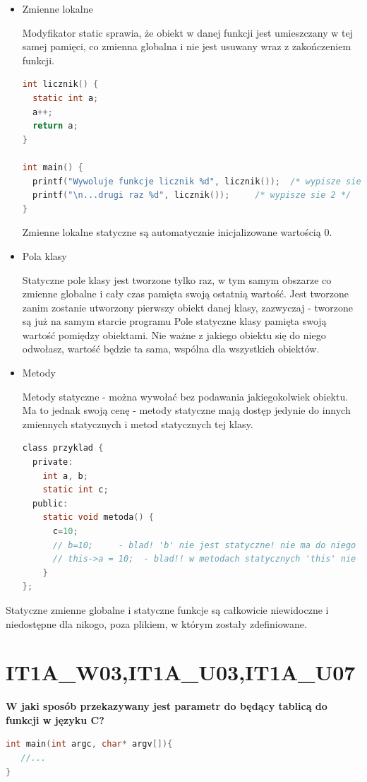 \begin{itemize}
\item Zmienne lokalne

Modyfikator static sprawia, że obiekt w danej funkcji jest umieszczany w tej samej pamięci, co zmienna globalna i nie jest usuwany wraz z zakończeniem funkcji.
\begin{lstlisting}[language=c]
int licznik() {
  static int a;
  a++;
  return a;
}

int main() {
  printf("Wywoluje funkcje licznik %d", licznik());  /* wypisze sie 1 */
  printf("\n...drugi raz %d", licznik());     /* wypisze sie 2 */ 
}
\end{lstlisting}

Zmienne lokalne statyczne są automatycznie inicjalizowane wartością 0.

\item Pola klasy

Statyczne pole klasy jest tworzone tylko raz, w tym samym obszarze co zmienne globalne i cały czas pamięta swoją ostatnią wartość. Jest tworzone zanim zostanie utworzony pierwszy obiekt danej klasy, zazwyczaj - tworzone są już na samym starcie programu
Pole statyczne klasy pamięta swoją wartość pomiędzy obiektami. Nie ważne z jakiego obiektu się do niego odwołasz, wartość będzie ta sama, wspólna dla wszystkich obiektów.

\item Metody

Metody statyczne - można wywołać bez podawania jakiegokolwiek obiektu. Ma to jednak swoją cenę - metody statyczne mają dostęp jedynie do innych zmiennych statycznych i metod statycznych tej klasy. 

\begin{lstlisting}[language=c]
class przyklad {
  private:
    int a, b;
    static int c;
  public:
    static void metoda() {
      c=10; 
      // b=10;     - blad! 'b' nie jest statyczne! nie ma do niego dostepu
      // this->a = 10;  - blad!! w metodach statycznych 'this' nie istnieje!!
    }
};
\end{lstlisting}
\end{itemize}

Statyczne zmienne globalne i statyczne funkcje są całkowicie niewidoczne i niedostępne dla nikogo, poza plikiem, w którym zostały zdefiniowane.



\section{IT1A\_W03,IT1A\_U03,IT1A\_U07} 
\textbf{W jaki sposób przekazywany jest parametr do będący tablicą do funkcji w języku C?}
\begin{lstlisting}[language=c]
int main(int argc, char* argv[]){
   //...
}
\end{lstlisting}

